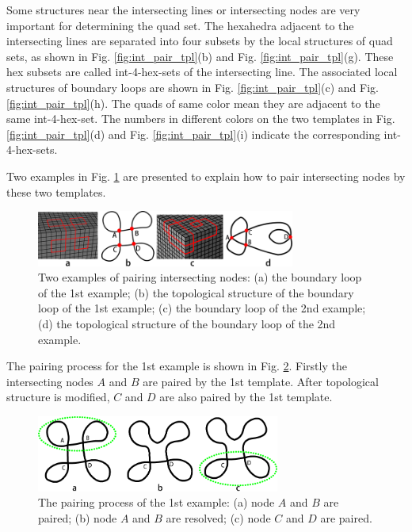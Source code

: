 \documentclass[final,5p,times,twocolumn]{elsarticle}
\begin{document}
Some structures near the intersecting lines or intersecting nodes are very important for determining the quad set. The hexahedra adjacent to the intersecting lines are separated into four subsets by the local structures of quad sets, as shown in Fig. \ref{fig:int_pair_tpl}(b) and Fig. \ref{fig:int_pair_tpl}(g). These hex subsets are called int-4-hex-sets of the intersecting line. The associated local structures of boundary loops are shown in Fig. \ref{fig:int_pair_tpl}(c) and Fig. \ref{fig:int_pair_tpl}(h). The quads of same color mean they are adjacent to the same int-4-hex-set. The numbers in different colors on the two templates in Fig. \ref{fig:int_pair_tpl}(d) and Fig. \ref{fig:int_pair_tpl}(i) indicate the corresponding int-4-hex-sets.

Two examples in Fig. \ref{fig:pair_int_exams} are presented to explain how to pair intersecting nodes by these two templates.

\begin{figure}[htbp]
\begin{center}
\includegraphics[width=8.5cm]{figures/pmatchexams.png}
\caption{Two examples of pairing intersecting nodes: (a) the boundary loop of the 1st example; (b) the topological structure of the boundary loop of the 1st example; (c) the boundary loop of the 2nd example; (d) the topological structure of the boundary loop of the 2nd example.}
\label{fig:pair_int_exams}
\end{center}
\end{figure}

The pairing process for the 1st example is shown in Fig. \ref{fig:pair_int_exam1_proc}. Firstly the intersecting nodes $A$ and $B$ are paired by the 1st template. After topological structure is modified, $C$ and $D$ are also paired by the 1st template.

\begin{figure}[htbp]
\begin{center}
\includegraphics[width=8cm]{figures/pmexam1step.png}
\caption{The pairing process of the 1st example: (a) node $A$ and $B$ are paired; (b) node $A$ and $B$ are resolved; (c) node $C$ and $D$ are paired.}
\label{fig:pair_int_exam1_proc}
\end{center}
\end{figure}
\end{document}

